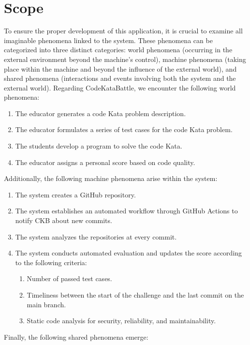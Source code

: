 \documentclass[12pt, a4paper]{report}
\begin{document}
    \section{Scope}
    To ensure the proper development of this application, it is crucial to examine all imaginable phenomena linked to the system.
    These phenomena can be categorized into three distinct categories: world phenomena (occurring in the external environment beyond the machine's control), machine phenomena (taking place within the machine and beyond the influence of the external world), and shared phenomena (interactions and events involving both the system and the external world).
    Regarding CodeKataBattle, we encounter the following world phenomena: 
    \begin{enumerate}
        \item The educator generates a code Kata problem description.
        \item The educator formulates a series of test cases for the code Kata problem.
        \item The students develop a program to solve the code Kata.
        \item The educator assigns a personal score based on code quality.
    \end{enumerate}
    Additionally, the following machine phenomena arise within the system: 
    \begin{enumerate}
        \item The system creates a GitHub repository.
        \item The system establishes an automated workflow through GitHub Actions to notify CKB about new commits.
        \item The system analyzes the repositories at every commit.
        \item The system conducts automated evaluation and updates the score according to the following criteria:
            \begin{enumerate}
                \item Number of passed test cases.
                \item Timeliness between the start of the challenge and the last commit on the main branch.
                \item Static code analysis for security, reliability, and maintainability.
            \end{enumerate}
    \end{enumerate}    
    Finally, the following shared phenomena emerge:
\end{document}
